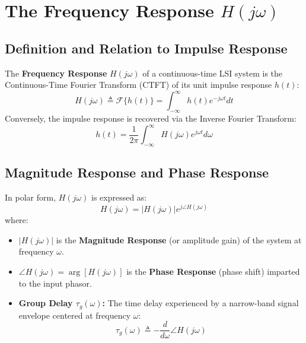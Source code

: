\documentclass[12pt,a4paper]{article}
\begin{document}
\section{The Frequency Response \texorpdfstring{$H(j\omega)$}{H(j omega)}}

\subsection{Definition and Relation to Impulse Response}

\begin{tcolorbox}[defbox, title={\textbf{Definition: Frequency Response}}]
The \textbf{Frequency Response} $H(j\omega)$ of a continuous-time LSI system is the Continuous-Time Fourier Transform (CTFT) of its unit impulse response $h(t)$:
\begin{equation}
  H(j\omega) \triangleq \mathcal{F}\{h(t)\} = \int_{-\infty}^{\infty} h(t) e^{-j\omega t} dt
\end{equation}
Conversely, the impulse response is recovered via the Inverse Fourier Transform:
\begin{equation}
  h(t) = \frac{1}{2\pi} \int_{-\infty}^{\infty} H(j\omega) e^{j\omega t} d\omega
\end{equation}
\end{tcolorbox}

\subsection{Magnitude Response and Phase Response}
In polar form, $H(j\omega)$ is expressed as:
\begin{equation}
  H(j\omega) = |H(j\omega)| e^{j \angle H(j\omega)}
\end{equation}
where:
\begin{itemize}[topsep=2pt, itemsep=2pt]
  \item $|H(j\omega)|$ is the \textbf{Magnitude Response} (or amplitude gain) of the system at frequency $\omega$.
  \item $\angle H(j\omega) = \arg[H(j\omega)]$ is the \textbf{Phase Response} (phase shift) imparted to the input phasor.
  \item \textbf{Group Delay $\tau_g(\omega)$:} The time delay experienced by a narrow-band signal envelope centered at frequency $\omega$:
  \begin{equation}
    \tau_g(\omega) \triangleq -\frac{d}{d\omega} \angle H(j\omega)
  \end{equation}
\end{itemize}
\end{document}
